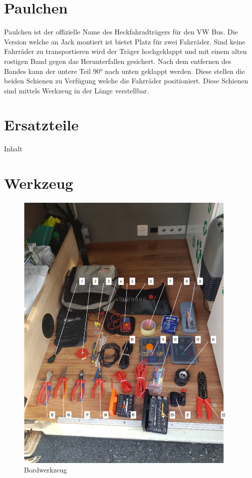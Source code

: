 \section{Paulchen}
Paulchen ist der offizielle Name des Heckfahradträgers für den VW Bus.
Die Version welche an Jack montiert ist bietet Platz für zwei Fahrräder.
Sind keine Fahrräder zu transportieren wird der Träger hochgeklappt und mit einem alten rostigen Band gegen das Herunterfallen gesichert.
Nach dem entfernen des Bandes kann der untere Teil 90° nach unten geklappt werden.
Diese stellen die beiden Schienen zu Verfügung welche die Fahrräder positioniert.
Diese Schienen sind mittels Werkzeug in der Länge verstellbar.

\section{Ersatzteile}
Inhalt

\section{Werkzeug}

\begin{figure}[H]
	\centering
    \includegraphics[width=0.95\textwidth]{../Bilder/Anleitung/Equipment_Bordwerkzeug.png}
	\caption{Bordwerkzeug}
    \label{Werkzeug}
\end{figure}

